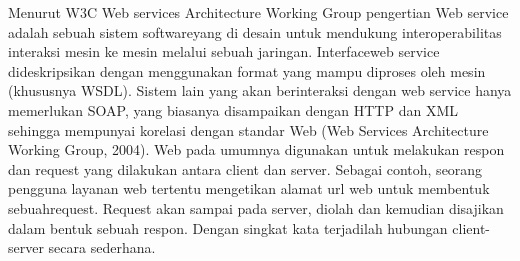 \documentclass[a4paper,11pt]{book}
\begin{document}
Menurut W3C Web services Architecture Working Group pengertian Web service adalah sebuah sistem softwareyang di desain untuk mendukung interoperabilitas interaksi mesin ke mesin melalui sebuah jaringan. Interfaceweb service dideskripsikan dengan menggunakan format yang mampu diproses oleh mesin (khususnya WSDL). Sistem lain yang akan berinteraksi dengan web service hanya memerlukan SOAP, yang biasanya disampaikan dengan HTTP dan XML sehingga mempunyai korelasi dengan standar Web (Web Services Architecture Working Group, 2004).
Web pada umumnya digunakan untuk melakukan respon dan request yang dilakukan antara client dan server. Sebagai contoh, seorang pengguna layanan web tertentu mengetikan alamat url web untuk membentuk sebuahrequest. Request akan sampai pada server, diolah dan kemudian disajikan dalam bentuk sebuah respon. Dengan singkat kata terjadilah hubungan client-server secara sederhana.
\end{document}
